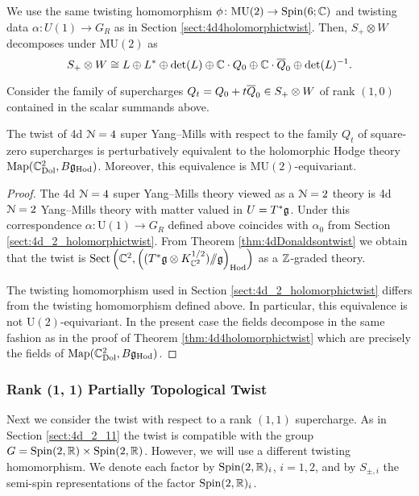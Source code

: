 \documentclass[10pt, oneside]{article}
\newcommand{\Hod}{\mathrm{Hod}}
\newcommand{\MU}{\mathrm{MU}}
\newcommand{\Sect}{\mathrm{Sect}}
\renewcommand{\U}{\mathrm{U}}
\newcommand{\ham}{/\!\!/}
\begin{document}
We use the same twisting homomorphism $\phi \colon \MU(2) \to \Spin(6;\CC)$ and twisting data $\alpha \colon U(1) \to G_R$ as in Section \ref{sect:4d4holomorphictwist}.
Then, $S_+ \otimes W$ decomposes under $\MU(2)$ as
\[
S_+\otimes W\cong L\oplus L^*\oplus \det(L)\oplus \CC \cdot Q_0 \oplus \CC \cdot \Bar{Q}_0 \oplus \det(L)^{-1}.
\]

Consider the family of supercharges $Q_t = Q_0 + t \Bar{Q}_0 \in S_+\otimes W$ of rank $(1, 0)$ contained in the scalar summands above.

\begin{theorem}
The twist of 4d $\cN=4$ super Yang--Mills with respect to the family $Q_t$ of square-zero supercharges is perturbatively equivalent to the holomorphic Hodge theory $\map(\CC^2_{\rm Dol}, B \fg_{\rm Hod})$. 
Moreover, this equivalence is $\MU(2)$-equivariant.
\label{thm:4d4Atwist}
\end{theorem}
\begin{proof}
The 4d $\cN=4$ super Yang--Mills theory viewed as a $\cN=2$ theory is 4d $\cN=2$ Yang--Mills theory with matter valued in $U=T^*\fg$. 
Under this correspondence $\alpha\colon \U(1)\rightarrow G_R$ defined above coincides with $\alpha_0$ from Section \ref{sect:4d_2_holomorphictwist}. 
From Theorem \ref{thm:4dDonaldsontwist} we obtain that the twist is $\Sect\left(\CC^2, \left((T^*\fg \otimes K_{\CC^2}^{1/2})\ham \fg\right)_{\Hod}\right)$ as a $\ZZ$-graded theory. 

The twisting homomorphism used in Section \ref{sect:4d_2_holomorphictwist} differs from the twisting homomorphism defined above. 
In particular, this equivalence is not $\U(2)$-equivariant. In the present case the fields decompose in the same fashion as in the proof of Theorem \ref{thm:4d4holomorphictwist} which are precisely the fields of $\map(\CC^2_{\rm Dol}, B \fg_{\rm Hod})$.
\end{proof}

\subsubsection{Rank (1, 1) Partially Topological Twist}
\label{sect:4d4partialtwist}

Next we consider the twist with respect to a rank $(1,1)$ supercharge. As in Section \ref{sect:4d_2_11} the twist is compatible with the group $G = \Spin(2, \RR) \times \Spin(2, \RR)$. However, we will use a different twisting homomorphism. We denote each factor by $\Spin(2, \RR)_i$, $i=1,2$, and by $S_{\pm, i}$ the semi-spin representations of the factor $\Spin(2, \RR)_i$.
\end{document}

